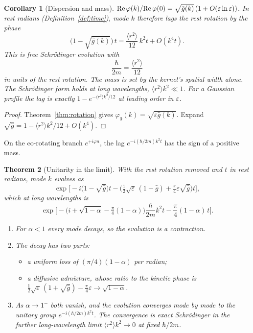 \documentclass[11pt]{amsart}
\newtheorem{theorem}{Theorem}[section]
\newtheorem{corollary}[theorem]{Corollary}
\theoremstyle{definition}
\theoremstyle{remark}
\newcommand{\eps}{\varepsilon}
\begin{document}
\begin{corollary}[Dispersion and mass]\label{cor:dispersion}
${\rm Re}\,\varphi(k)/{\rm Re}\,\varphi(0)=\sqrt{\hat g(k)}\,(1+O(\eps\ln\eps))$. In rest radians (Definition~\ref{def:time}), mode $k$ therefore lags the rest rotation by the phase
\[
\big(1-\sqrt{\hat g(k)}\big)\,t=\frac{\langle r^2\rangle}{12}\,k^2t+O(k^4t).
\]
This is free Schr\"odinger evolution with
\[
\frac{\hbar}{2m}=\frac{\langle r^2\rangle}{12}
\]
in units of the rest rotation. The mass is set by the kernel's spatial width alone. The Schr\"odinger form holds at long wavelengths, $\langle r^2\rangle k^2\ll1$. For a Gaussian profile the lag is exactly $1-e^{-\langle r^2\rangle k^2/12}$ at leading order in $\eps$.
\end{corollary}

\begin{proof}
Theorem~\ref{thm:rotation} gives $\varphi_0(k)=\sqrt{\eps\hat g(k)}$. Expand $\sqrt{\hat g}=1-\langle r^2\rangle k^2/12+O(k^4)$. \end{proof}

On the co-rotating branch $e^{+i\varphi n}$, the lag $e^{-i(\hbar/2m)k^2t}$ has the sign of a positive mass.

\begin{theorem}[Unitarity in the limit]\label{thm:unitary}
With the rest rotation removed and $t$ in rest radians, mode $k$ evolves as
\[
\exp\Big[-i\big(1-\sqrt{\hat g}\big)t-\Big(\tfrac12\sqrt\eps\,(1-\hat g)+\tfrac\pi4\eps\sqrt{\hat g}\Big)t\Big],
\]
which at long wavelengths is
\[
\exp\Big[-\big(i+\sqrt{1-\alpha}-\tfrac\pi4(1-\alpha)\big)\frac{\hbar}{2m}k^2t-\frac\pi4(1-\alpha)\,t\Big].
\]
\begin{enumerate}
\item For $\alpha<1$ every mode decays, so the evolution is a contraction.
\item The decay has two parts:
\begin{itemize}
\item a uniform loss of $(\pi/4)(1-\alpha)$ per radian;
\item a diffusive admixture, whose ratio to the kinetic phase is $\tfrac12\sqrt\eps\,(1+\sqrt{\hat g})-\tfrac\pi4\eps\to\sqrt{1-\alpha}$.
\end{itemize}
\item As $\alpha\to1^-$ both vanish, and the evolution converges mode by mode to the unitary group $e^{-i(\hbar/2m)k^2t}$. The convergence is exact Schr\"odinger in the further long-wavelength limit $\langle r^2\rangle k^2\to0$ at fixed $\hbar/2m$.
\end{enumerate}
\end{theorem}
\end{document}
